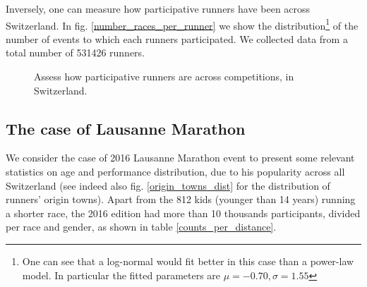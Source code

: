 \documentclass[fleqn,10pt]{wlscirep}
\begin{document}
		Inversely, one can measure how participative runners have been across Switzerland. 
		In fig. \ref{number_races_per_runner} we show the distribution\footnote{		One can see that a log-normal would fit better in this case than a power-law model. In particular the fitted parameters are $ \mu = -0.70, \sigma  = 1.55 $} of  the number of events to which each runners participated. We collected data from  a total number of 531426 runners.

		
		
		\begin{figure}[h]	
			\centering
			
			
			\caption{Assess how participative runners are across competitions, in Switzerland.}
		\end{figure}					
			
	\subsection*{The case of Lausanne Marathon}
		
		We consider the case of 2016 Lausanne Marathon event to present some relevant statistics on age and performance distribution, due to his popularity across all Switzerland (see indeed also fig. \ref{origin_towns_dist} for the distribution of runners' origin towns).
		Apart from the 812 kids (younger than 14 years) running  a shorter race, the 2016 edition had more than 10 thousands participants, divided per race  and gender, as shown in table \ref{counts_per_distance}. 
\end{document}
